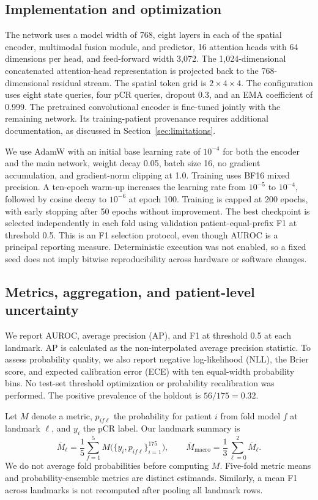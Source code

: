 \subsection{Implementation and optimization}
The network uses a model width of 768, eight layers in each of the spatial encoder, multimodal fusion module, and predictor, 16 attention heads with 64 dimensions per head, and feed-forward width 3,072. The 1,024-dimensional concatenated attention-head representation is projected back to the 768-dimensional residual stream. The spatial token grid is $2\times4\times4$. The configuration uses eight state queries, four pCR queries, dropout 0.3, and an EMA coefficient of 0.999. The pretrained convolutional encoder is fine-tuned jointly with the remaining network. Its training-patient provenance requires additional documentation, as discussed in Section~\ref{sec:limitations}.

We use AdamW \citep{adamw2019} with an initial base learning rate of $10^{-4}$ for both the encoder and the main network, weight decay 0.05, batch size 16, no gradient accumulation, and gradient-norm clipping at 1.0. Training uses BF16 mixed precision. A ten-epoch warm-up increases the learning rate from $10^{-5}$ to $10^{-4}$, followed by cosine decay to $10^{-6}$ at epoch 100. Training is capped at 200 epochs, with early stopping after 50 epochs without improvement. The best checkpoint is selected independently in each fold using validation patient-equal-prefix F1 at threshold 0.5. This is an F1 selection protocol, even though AUROC is a principal reporting measure. Deterministic execution was not enabled, so a fixed seed does not imply bitwise reproducibility across hardware or software changes.

\subsection{Metrics, aggregation, and patient-level uncertainty}
We report AUROC, average precision (AP), and F1 at threshold 0.5 at each landmark. AP is calculated as the non-interpolated average precision statistic. To assess probability quality, we also report negative log-likelihood (NLL), the Brier score, and expected calibration error (ECE) with ten equal-width probability bins. No test-set threshold optimization or probability recalibration was performed. The positive prevalence of the holdout is $56/175=0.32$.

Let $M$ denote a metric, $p_{if\ell}$ the probability for patient $i$ from fold model $f$ at landmark $\ell$, and $y_i$ the pCR label. Our landmark summary is
\begin{equation}
 \overline M_{\ell}=\frac{1}{5}\sum_{f=1}^{5}M\bigl(\{y_i,p_{if\ell}\}_{i=1}^{175}\bigr),
 \qquad
 \overline M_{\mathrm{macro}}=\frac{1}{3}\sum_{\ell=0}^{2}\overline M_{\ell}.
\end{equation}
We do not average fold probabilities before computing $M$. Five-fold metric means and probability-ensemble metrics are distinct estimands. Similarly, a mean F1 across landmarks is not recomputed after pooling all landmark rows.

